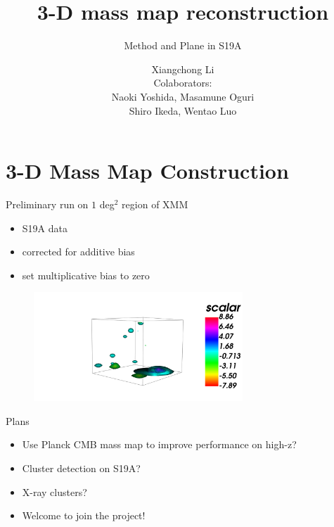 \documentclass[9pt]{beamer}
\title{3-D mass map reconstruction}
\subtitle{Method and Plane in S19A}
\author{Xiangchong Li\\
Colaborators:\\
Naoki Yoshida, Masamune Oguri\\
Shiro Ikeda, Wentao Luo
}
\begin{document}
\titlepage


\section{3-D Mass Map Construction}



\begin{frame}{Preliminary run on $1$ deg$^2$ region of XMM}
\begin{itemize}
    \item S19A data
    \item corrected for additive bias
    \item set multiplicative bias to zero
\end{itemize}
\begin{figure}
\centering
\includegraphics[width=0.7\textwidth]{snapshot.png}
\end{figure}
\end{frame}

\begin{frame}{Plans}
\begin{itemize}
    \item Use Planck CMB mass map to improve performance on high-z?
    \item Cluster detection on S19A?
    \item X-ray clusters?
    \item Welcome to join the project!
\end{itemize}
\end{frame}
\end{document}
